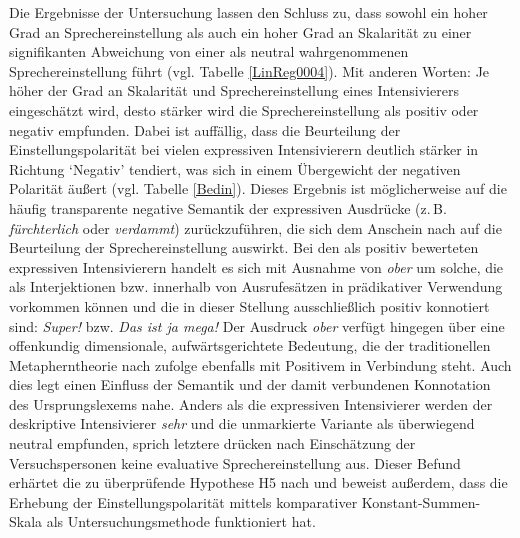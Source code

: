 Die Ergebnisse der Untersuchung lassen den Schluss zu, dass sowohl ein hoher Grad an Sprechereinstellung als auch ein hoher Grad an Skalarität zu einer signifikanten Abweichung von einer als neutral wahrgenommenen Sprechereinstellung führt (vgl. Tabelle \ref{LinReg0004}). Mit anderen Worten: Je höher der Grad an Skalarität und Sprechereinstellung eines Intensivierers eingeschätzt wird, desto stärker wird die Sprechereinstellung als positiv oder negativ empfunden. Dabei ist auffällig, dass die Beurteilung der Einstellungspolarität bei vielen expressiven Intensivierern deutlich stärker in Richtung `Negativ' tendiert, was sich in einem Übergewicht der negativen Polarität äußert (vgl. Tabelle \ref{Bedin}). Dieses Ergebnis ist möglicherweise auf die häufig transparente negative Semantik der expressiven Ausdrücke (z.\,B. \textit{fürchterlich} oder \textit{verdammt}) zurückzuführen, die sich dem Anschein nach auf die Beurteilung der Sprechereinstellung auswirkt.
Bei den als positiv bewerteten expressiven Intensivierern handelt es sich mit Ausnahme von \textit{ober} um solche, die als Interjektionen bzw. innerhalb von Ausrufesätzen in prädikativer Verwendung vorkommen können und die in dieser Stellung ausschließlich positiv konnotiert sind: \textit{Super!} bzw. \textit{Das ist ja mega!} Der Ausdruck \textit{ober} verfügt hingegen über eine offenkundig dimensionale, aufwärtsgerichtete Bedeutung, die der traditionellen Metapherntheorie nach \citet[14ff.]{Lakoff.1980} zufolge ebenfalls mit Positivem in Verbindung steht. Auch dies legt einen Einfluss der Semantik und der damit verbundenen Konnotation des Ursprungslexems nahe. Anders als die expressiven Intensivierer werden der deskriptive Intensivierer \textit{sehr} und die unmarkierte Variante als überwiegend neutral empfunden, sprich letztere drücken nach Einschätzung der Versuchspersonen keine evaluative Sprechereinstellung aus.  Dieser Befund erhärtet die zu überprüfende {Hypothese H5} nach {\citet[135]{Gutzmann.2019a}} und beweist außerdem, dass die Erhebung der Einstellungspolarität mittels komparativer Konstant-Summen-Skala als Untersuchungsmethode funktioniert hat.


